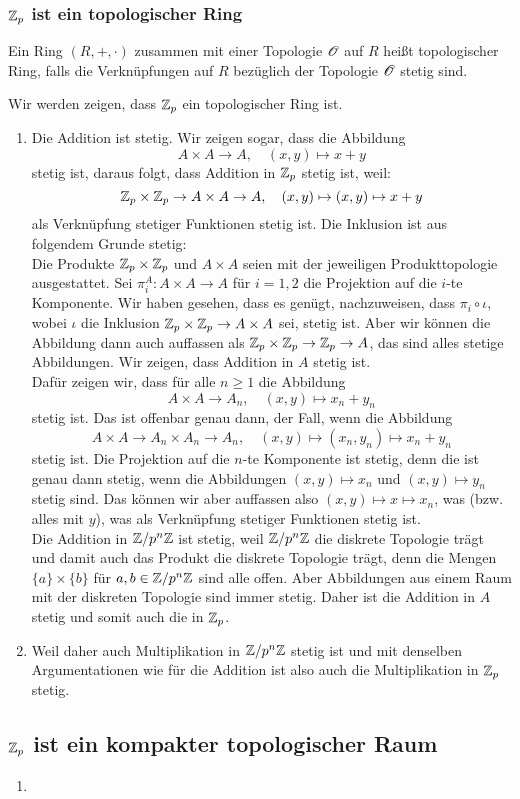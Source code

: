 \subsubsection*{$\mathbb{Z}_p$ ist ein topologischer Ring} \begin{defn}
    Ein Ring $(R,+,\cdot)$ zusammen mit einer Topologie $\mathscr{O}$ auf $R$ heißt topologischer Ring, falls die Verknüpfungen auf $R$ bezüglich der Topologie $\mathscr{O}$ stetig sind.
\end{defn}
Wir werden zeigen, dass $\mathbb{Z}_p$ ein topologischer Ring ist. 
\begin{enumerate}[(1)]
    \item Die Addition ist stetig. Wir zeigen sogar, dass die Abbildung
    \[
    A\times A\to A, \quad (x,y)\mapsto x+y    
    \]
    stetig ist, daraus folgt, dass Addition in $\mathbb{Z}_p$ stetig ist, weil:
    \[
    \mathbb{Z}_p \times \mathbb{Z}_p \to A\times A \to A,\quad  (x,y)\mapsto (x,y)\mapsto x+y
    \]
    als Verknüpfung stetiger Funktionen stetig ist. Die Inklusion ist aus folgendem Grunde stetig:
    \\ Die Produkte $\mathbb{Z}_p \times \mathbb{Z}_p$ und $A\times A$ seien mit der jeweiligen Produkttopologie ausgestattet. Sei $\pi^A_i:A\times A\to A$ für $i=1,2$ die Projektion auf die $i$-te Komponente. Wir haben gesehen, dass es genügt, nachzuweisen, dass $\pi_i \circ \iota$, wobei $\iota$ die Inklusion $\mathbb{Z}_p \times \mathbb{Z}_p \to A\times A$ sei, stetig ist.
    Aber wir können die Abbildung dann auch auffassen als $\mathbb{Z}_p \times \mathbb{Z}_p \to \mathbb{Z}_p \to A$, das sind alles stetige Abbildungen. Wir zeigen, dass Addition in $A$ stetig ist.
    \\ Dafür zeigen wir, dass für alle $n\ge 1$ die Abbildung
    \[
    A\times A\to A_n, \quad (x,y)\mapsto x_n+y_n    
    \]
    stetig ist. Das ist offenbar genau dann, der Fall, wenn die Abbildung
    \[
    A\times A \to A_n\times A_n \to A_n, \quad (x,y)\mapsto (x_n,y_n)\mapsto x_n+y_n    
    \]
    stetig ist. Die Projektion auf die $n$-te Komponente ist stetig, denn die ist genau dann stetig, wenn die Abbildungen $(x,y)\mapsto x_n$ und $(x,y)\mapsto y_n$ stetig sind. Das können wir aber auffassen also $(x,y)\mapsto x \mapsto x_n$, was (bzw. alles mit $y$), was als Verknüpfung stetiger Funktionen stetig ist. \\
    Die Addition in $\mathbb{Z}/p^n\mathbb{Z}$ ist stetig, weil $\mathbb{Z}/p^n\mathbb{Z}$ die diskrete Topologie trägt und damit auch das Produkt die diskrete Topologie trägt, denn die Mengen $\{a\}\times \{b\}$ für $a,b\in \mathbb{Z}/p^n\mathbb{Z}$ sind alle offen. Aber Abbildungen aus einem Raum mit der diskreten Topologie sind immer stetig. Daher ist die Addition in $A$ stetig und somit auch die in $\mathbb{Z}_p$. 
    \item Weil daher auch Multiplikation in $\mathbb{Z}/p^n\mathbb{Z}$ stetig ist und mit denselben Argumentationen wie für die Addition ist also auch die Multiplikation in $\mathbb{Z}_p$ stetig.
\end{enumerate}
\subsection*{$\mathbb{Z}_p$ ist ein kompakter topologischer Raum}
\begin{enumerate}
    \item 
\end{enumerate}